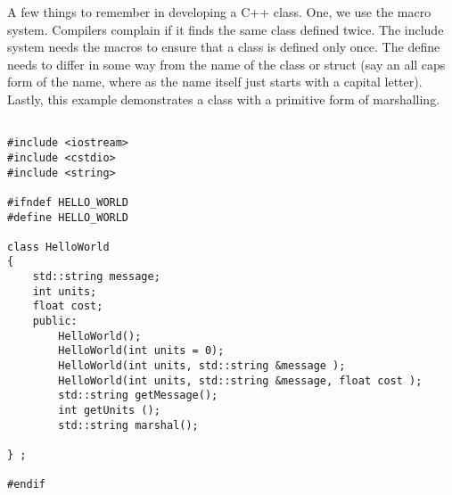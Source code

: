 \documentclass{article}
\begin{document}
A few things to remember in developing a C++ class.  One, we use the macro system.  Compilers complain if it finds the same class defined twice.  The include system needs the macros to ensure that a class is defined only once.  The define needs to differ in some way from the name of the class or struct (say an all caps form of the name, where as the name itself just starts with a capital letter).  Lastly, this example demonstrates a class with a primitive form of marshalling.
\newpage
\begin{lstlisting}
	
#include <iostream>
#include <cstdio>
#include <string>

#ifndef HELLO_WORLD
#define HELLO_WORLD

class HelloWorld
{
    std::string message;
    int units;
	float cost;
    public:
        HelloWorld();
        HelloWorld(int units = 0);
        HelloWorld(int units, std::string &message );
        HelloWorld(int units, std::string &message, float cost );
        std::string getMessage();
        int getUnits ();
		std::string marshal();

} ;

#endif 
\end{lstlisting}


 
\end{document}
